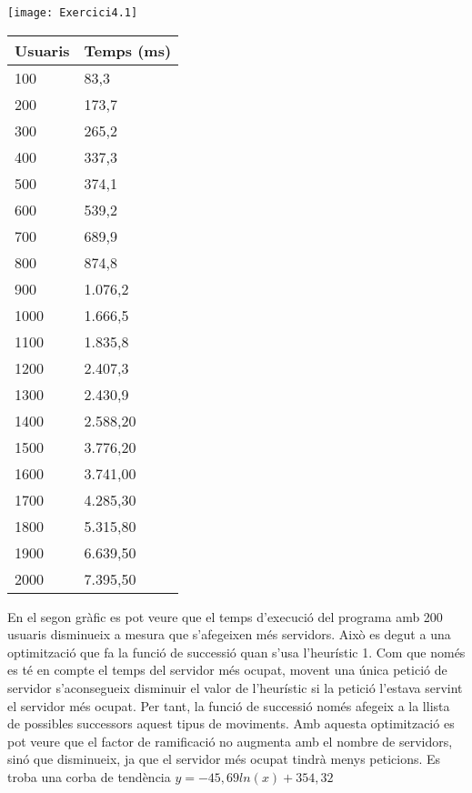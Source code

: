 \documentclass[a4paper, 12pt]{article}
\begin{document}
\begin{minipage}[b]{\linewidth}
	\centering
	\begin{minipage}[b]{0.68\linewidth}
		\centering
		\texttt{[image: Exercici4.1]}
	\end{minipage}
	\hfill
	\begin{minipage}[b]{0.3\linewidth}
	\scriptsize
	\centering
	\begin{tabular}{l | l}
	Usuaris & Temps (ms) \\
	\hline
	100 & 83,3 \\
	200 & 173,7 \\
	300 & 265,2 \\
	400 & 337,3 \\
	500 & 374,1 \\
	600 & 539,2 \\
	700 & 689,9 \\
	800 & 874,8 \\
	900 & 1.076,2 \\
	1000 & 1.666,5 \\
	1100 & 1.835,8 \\
	1200 & 2.407,3 \\
	1300 & 2.430,9 \\
	1400 &	2.588,20 \\
	1500 &	3.776,20\\
	1600 &	3.741,00\\
	1700 &	4.285,30\\
	1800 &	5.315,80\\
	1900 &	6.639,50\\
	2000 &	7.395,50\\
	\end{tabular}
	\end{minipage}
\end{minipage}
\vspace{1cm}

En el segon gràfic es pot veure que el temps d'execució del programa amb 200 usuaris disminueix a mesura que s'afegeixen més 
servidors. Això es degut a una optimització que fa la funció de successió quan s'usa l'heurístic 1. Com que només es té en 
compte el temps del servidor més ocupat, movent una única petició de servidor s'aconsegueix disminuir el valor de l'heurístic
si la petició l'estava servint el servidor més ocupat. Per tant, la funció de successió només afegeix a la llista de possibles 
successors aquest tipus de moviments. Amb aquesta optimització es pot veure que el factor de ramificació no augmenta amb el 
nombre de servidors, sinó que disminueix, ja que el servidor més ocupat tindrà menys peticions. Es troba una corba de tendència
$ y = -45,69ln(x) + 354,32 $
\end{document}
